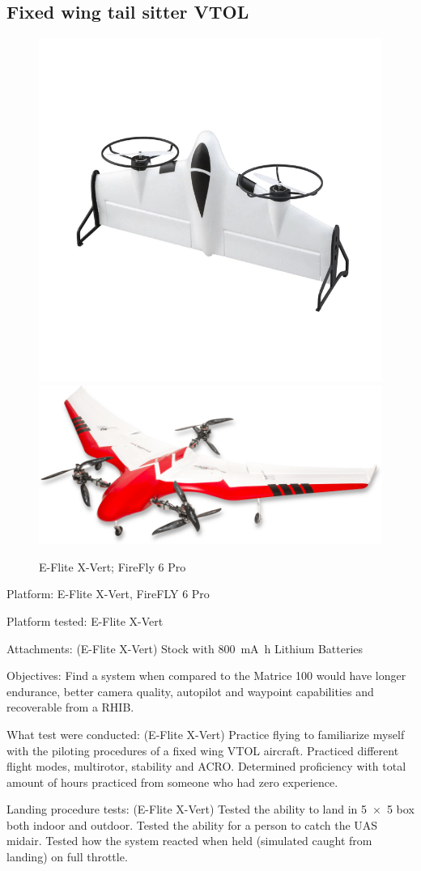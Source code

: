 \subsection{Fixed wing tail sitter VTOL}
\begin{figure}
\begin{center}
\includegraphics[width=0.49\columnwidth]{figures/survey3a.png}
\includegraphics[width=0.49\columnwidth]{figures/survey3b.png}
\end{center}
\caption{E-Flite X-Vert; FireFly 6 Pro}
\end{figure}

Platform: E-Flite X-Vert, FireFLY 6 Pro

Platform tested: E-Flite X-Vert

Attachments: (E-Flite X-Vert) Stock with \SI{800}{\milli\ampere\hour} Lithium Batteries

Objectives: Find a system when compared to the Matrice 100 would have longer endurance, better camera quality, autopilot and waypoint capabilities and recoverable from a RHIB.

What test were conducted: (E-Flite X-Vert) Practice flying to familiarize myself with the piloting procedures of a fixed wing VTOL aircraft. Practiced different flight modes, multirotor, stability and ACRO. Determined proficiency with total amount of hours practiced from someone who had zero experience.

Landing procedure tests: (E-Flite X-Vert) Tested the ability to land in \SI{5x5}{\foot} box both indoor and outdoor. Tested the ability for a person to catch the UAS midair. Tested how the system reacted when held (simulated caught from landing) on full throttle. 

